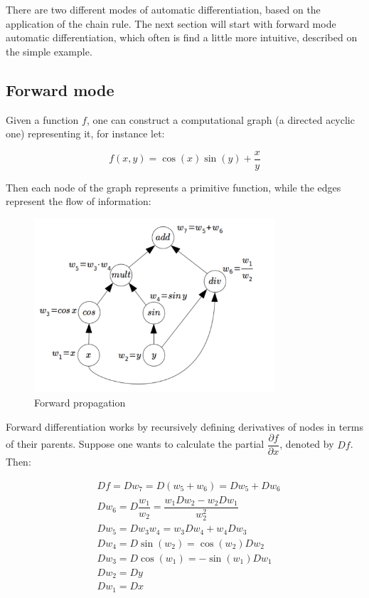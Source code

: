 \documentclass{pracamgr}
\numberwithin{equation}{section}
\begin{document}
There are two different modes of automatic differentiation, based on the application of the chain rule. The next section will start with forward mode automatic differentiation, which often is find a little more intuitive, described on the simple example.

\subsection{Forward mode}

Given a function $f$, one can construct a computational graph (a directed acyclic one) representing it, for instance let:

\[ f(x,y) = \cos(x) \sin(y) + \dfrac{x}{y} \]

Then each node of the graph represents a primitive function, while the edges represent the flow of information:

\begin{figure}[H]
\centering
\includegraphics[width=0.8\textwidth,height=0.8\textheight,keepaspectratio]{Aut_diff}
\caption[Forward propagation]{Forward propagation\footnotemark}
\label{Forward_propagation}
\end{figure}


Forward differentiation works by recursively defining derivatives of nodes in terms of their parents. Suppose one wants to calculate the partial $\dfrac{\partial f}{\partial x}$, denoted by $Df$. Then:

\begin{align*}
& Df = Dw_{7} = D(w_{5} + w_{6}) = Dw_{5} + Dw_{6} \\
& Dw_{6} = D\dfrac{w_{1}}{w_{2}} = \dfrac{w_{1}Dw_{2}- w_{2}Dw_{1}}{w_{2}^{2}}  \\
& Dw_{5} = Dw_{3}w_{4} = w_{3}Dw_{4} + w_{4}Dw_{3} \\
& Dw_{4} = D\sin(w_{2}) = \cos(w_{2}) Dw_{2} \\
& Dw_{3} = D\cos(w_{1}) = -\sin(w_{1}) Dw_{1} \\
& Dw_{2} = Dy \\
& Dw_{1} = Dx 
\end{align*}
\end{document}
